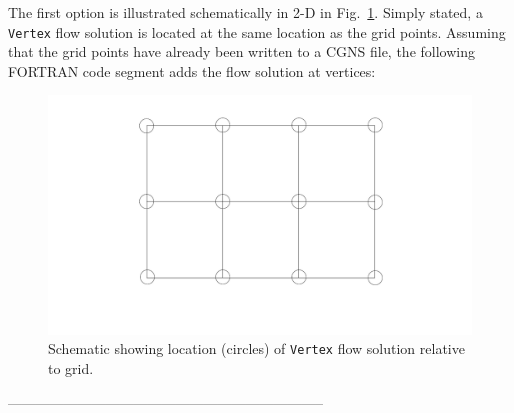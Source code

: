 \documentclass[12pt]{article}
\begin{document}
The first option is illustrated schematically in 2-D in 
Fig.~\ref{FIGvertex}.  Simply stated, a {\tt Vertex} flow solution is located at the
same location as the grid points.  Assuming that the
grid points have already been written to a CGNS file, the
following FORTRAN code segment adds the flow solution at
vertices:

\begin{figure}[hpbt]
\centerline{{\includegraphics[width=120mm]{figures/vertex}}}
\caption{Schematic showing location (circles) of {\tt Vertex} 
flow solution relative to grid.}
\label{FIGvertex}
\end{figure}
%

--------------------------------------------------------------------
\end{document}
